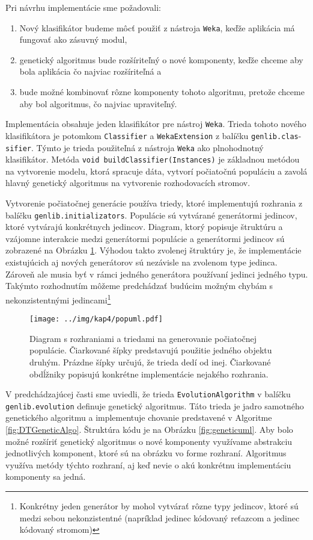 Pri návrhu implementácie sme požadovali:
\begin{enumerate}
\item Nový klasifikátor budeme môcť použiť z nástroja \verb|Weka|, keďže aplikácia má fungovať ako zásuvný modul,
\item genetický algoritmus bude rozšíriteľný o nové komponenty, keďže chceme aby bola aplikácia čo najviac rozšíriteľná a
\item bude možné kombinovať rôzne komponenty tohoto algoritmu, pretože chceme aby bol algoritmus, čo najviac upraviteľný.
\end{enumerate}

Implementácia obsahuje jeden klasifikátor pre nástroj \verb|Weka|. Trieda tohoto nového klasifikátora je potomkom \verb|Classifier| a \verb|WekaExtension| z balíčku \verb|genlib.clas|- \verb|sifier|. Týmto je trieda použiteľná z nástroja \verb|Weka| ako plnohodnotný klasifikátor. Metóda \verb|void buildClassifier(Instances)| je základnou metódou na vytvorenie modelu, ktorá spracuje dáta, vytvorí počiatočnú populáciu a zavolá hlavný genetický algoritmus na vytvorenie rozhodovacích stromov. 

Vytvorenie počiatočnej generácie používa triedy, ktoré implementujú rozhrania z balíčku \verb|genlib.initializators|. Populácie sú vytvárané generátormi jedincov, ktoré vytvárajú konkrétnych jedincov. Diagram, ktorý popisuje štruktúru a vzájomne interakcie medzi generátormi populácie a generátormi jedincov sú zobrazené na Obrázku \ref{fig:popuml}. Výhodou takto zvolenej štruktúry je, že implementácie existujúcich aj nových generátorov sú nezávisle na zvolenom type jedinca. Zároveň ale musia byť v rámci jedného generátora používaní jedinci jedného typu. Takýmto rozhodnutím môžeme predchádzať budúcim možným chybám s nekonzistentnými jedincami\footnote{Konkrétny jeden generátor by mohol vytvárať rôzne typy jedincov, ktoré sú medzi sebou nekonzistentné (napríklad jedinec kódovaný reťazcom a jedinec kódovaný stromom)}

\begin{figure}[h]
\centering
\centerline{\mbox{\texttt{[image: ../img/kap4/popuml.pdf]}}}
\caption{Diagram s rozhraniami a triedami na generovanie počiatočnej populácie. Čiarkované šípky predstavujú použitie jedného objektu druhým. Prázdne šípky určujú, že trieda dedí od inej. Čiarkované obdĺžniky popisujú konkrétne implementácie nejakého rozhrania.}\label{fig:popuml}
\end{figure}

V predchádzajúcej časti sme uviedli, že trieda \verb|EvolutionAlgorithm| v balíčku \verb|genlib.evolution| definuje genetický algoritmus. Táto trieda je jadro samotného genetického algoritmu a implementuje chovanie predstavené v Algoritme \ref{fig:DTGeneticAlgo}. Štruktúra kódu je na Obrázku \ref{fig:geneticuml}. Aby bolo možné rozšíriť genetický algoritmus o nové komponenty využívame abstrakciu jednotlivých komponent, ktoré sú na obrázku vo forme rozhraní. Algoritmus využíva metódy týchto rozhraní, aj keď nevie o akú konkrétnu implementáciu komponenty sa jedná.

